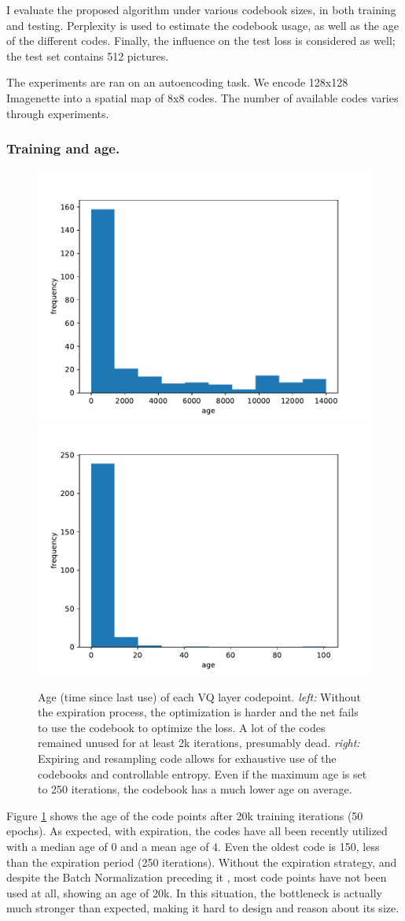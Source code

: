 I evaluate the proposed algorithm under various codebook sizes, in both training and testing. Perplexity is used to estimate the codebook usage, as well as the age of the different codes. Finally, the influence on the test loss is considered as well; the test set contains 512 pictures.

The experiments are ran on an autoencoding task. We encode 128x128 Imagenette \citep{imagenette} into a spatial map of 8x8 codes. The number of available codes varies through experiments. 

\subsubsection{Training and age.}

\begin{figure}
    \centering
    \includegraphics[width=0.45\columnwidth]{60-files/age.pdf}
    \includegraphics[width=0.45\columnwidth]{60-files/age-aging.pdf}
    \caption{Age (time since last use) of each VQ layer codepoint. \emph{left:} Without the expiration process, the optimization is harder and the net fails to use the codebook to optimize the loss. A lot of the codes remained unused for at least 2k iterations, presumably dead. \emph{right:} Expiring and resampling code allows for exhaustive use of the codebooks and controllable entropy. Even if the maximum age is set to 250 iterations, the codebook has a much lower age on average.}
    \label{fig:agingvq-age}
\end{figure}

Figure \ref{fig:agingvq-age} shows the age of the code points after 20k training iterations (50 epochs). As expected, with expiration, the codes have all been recently utilized with a median age of 0 and a mean age of 4. Even the oldest code is 150, less than the expiration period (250 iterations). Without the expiration strategy, and despite the Batch Normalization preceding it \citep{robustvq}, most code points have not been used at all, showing an age of 20k. In this situation, the bottleneck is actually much stronger than expected, making it hard to design and reason about its size.

